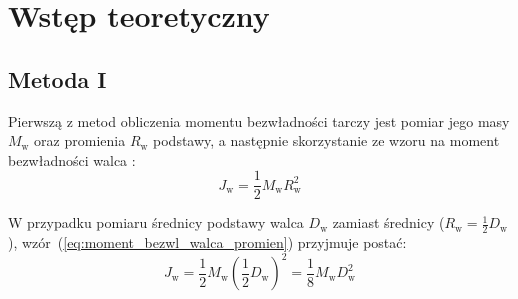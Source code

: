 \documentclass[twocolumn, a4paper, polish, 10pt]{article}
\begin{document}
\sectionfont{\centering\large}%

\section{Wstęp teoretyczny}
\subsection{Metoda I}
Pierwszą z metod obliczenia momentu bezwładności tarczy jest pomiar jego masy $M_{\mathrm{w}}$ oraz promienia $R_{\mathrm{w}}$ podstawy, a następnie skorzystanie ze wzoru na moment bezwładności walca \cite{eFizyka_bryla_sztywna}:
\begin{equation}
    J_{\mathrm{w}} = \frac{1}{2} M_{\mathrm{w}} R_{\mathrm{w}}^2
\label{eq:moment_bezwl_walca_promien}
\end{equation}

W przypadku pomiaru średnicy podstawy walca $D_{\mathrm{w}}$ zamiast średnicy ($R_{\mathrm{w}} = \frac{1}{2} D_{\mathrm{w}}$), wzór~(\ref{eq:moment_bezwl_walca_promien}) przyjmuje postać:
\begin{equation}
    J_{\mathrm{w}} = \frac{1}{2} M_{\mathrm{w}} (\frac{1}{2} D_{\mathrm{w}})^2 = \frac{1}{8} M_{\mathrm{w}} D_{\mathrm{w}} ^2
\label{eq:moment_bezwl_walca_srednica}
\end{equation}
\end{document}
